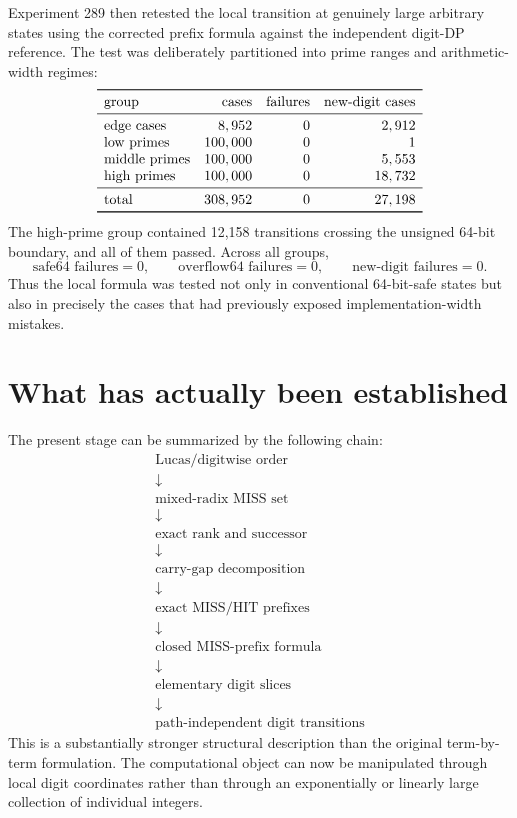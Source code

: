 \documentclass[11pt,a4paper]{article}
\theoremstyle{definition}
\theoremstyle{remark}
\begin{document}
Experiment 289 then retested the local transition at genuinely large arbitrary states using the corrected prefix formula against the independent digit-DP reference.  The test was deliberately partitioned into prime ranges and arithmetic-width regimes:
\[
\begin{array}{lrrr}
\toprule
\text{group} & \text{cases} & \text{failures} & \text{new-digit cases}\\
\midrule
\text{edge cases}&8,952&0&2,912\\
\text{low primes}&100,000&0&1\\
\text{middle primes}&100,000&0&5,553\\
\text{high primes}&100,000&0&18,732\\
\midrule
\text{total}&308,952&0&27,198\\
\bottomrule
\end{array}
\]
The high-prime group contained 12,158 transitions crossing the unsigned 64-bit boundary, and all of them passed.  Across all groups,
\[
\text{safe64 failures}=0,
\qquad
\text{overflow64 failures}=0,
\qquad
\text{new-digit failures}=0.
\]
Thus the local formula was tested not only in conventional 64-bit-safe states but also in precisely the cases that had previously exposed implementation-width mistakes.

\section{What has actually been established}

The present stage can be summarized by the following chain:
\[
\boxed{
\begin{array}{c}
\text{Lucas/digitwise order}\\
\downarrow\\
\text{mixed-radix MISS set}\\
\downarrow\\
\text{exact rank and successor}\\
\downarrow\\
\text{carry-gap decomposition}\\
\downarrow\\
\text{exact MISS/HIT prefixes}\\
\downarrow\\
\text{closed MISS-prefix formula}\\
\downarrow\\
\text{elementary digit slices}\\
\downarrow\\
\text{path-independent digit transitions}
\end{array}}
\]
This is a substantially stronger structural description than the original term-by-term formulation.  The computational object can now be manipulated through local digit coordinates rather than through an exponentially or linearly large collection of individual integers.
\end{document}
